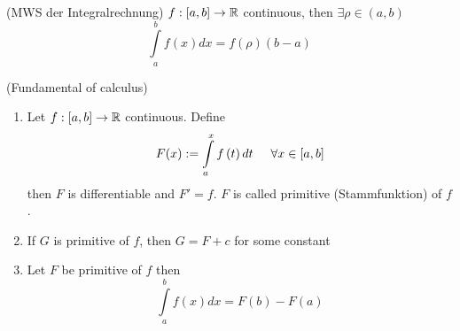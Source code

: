 \documentclass[a4paper]{article}
\begin{document}
\begin{fact}{(MWS der Integralrechnung)}
$f:\lbrack a,b\rbrack\to\mathbb{R}$ continuous, then $\exists \rho\in (a,b)$
\[\int\limits_a^b f(x) dx=f(\rho)(b-a)\]
\end{fact}


\begin{fact}{(Fundamental  of calculus)}
\begin{enumerate}
\item Let $f:\lbrack a,b\rbrack\to\mathbb{R}$ continuous. Define 
\[F(x): = \int\limits_a^x {f\left( t \right)dt}\hspace{5mm} \forall x \in \left[ {a,b} \right]\]
then $F$ is differentiable and $F'=f$. $F$ is called primitive (Stammfunktion) of $f$.
\item If $G$ is  primitive of $f$, then $G=F+c$ for some constant
\item Let $F$ be  primitive of $f$ then \[\int\limits_a^b f(x)dx=F(b)-F(a)\]
\end{enumerate}
\end{fact}
\end{document}
